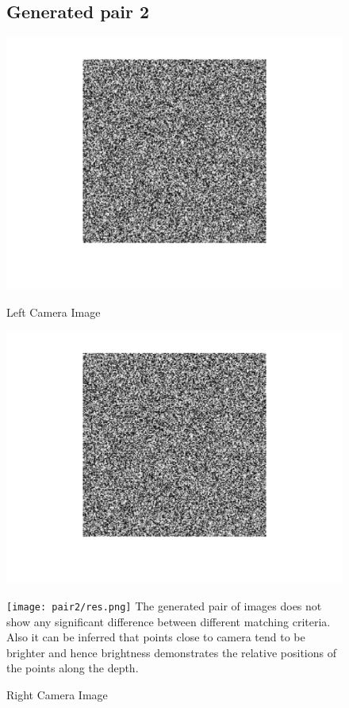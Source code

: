 \documentclass[12pt]{article}
\begin{document}
   
  \begin{figure}[!htb]
   \subsection{Generated pair 2}
    \centering
    \begin{minipage}{.5\textwidth}
        \centering
        \includegraphics[width=0.7\linewidth]{pair2/scene_l.png}
        \caption{Left Camera Image }
        \label{fig:3}
    \end{minipage}%
    \begin{minipage}{0.5\textwidth}
        \centering
        \includegraphics[width=0.7\linewidth]{pair2/scene_r.png}
        \caption{Right Camera Image}
        \label{fig:4}
    \end{minipage}
      
      \texttt{[image: pair2/res.png]}
      The generated pair of images does not show any significant difference between different matching criteria. Also it can be inferred that points close to camera tend to be brighter and hence brightness demonstrates the relative positions of the points along the depth.
\end{figure}
\end{document}
